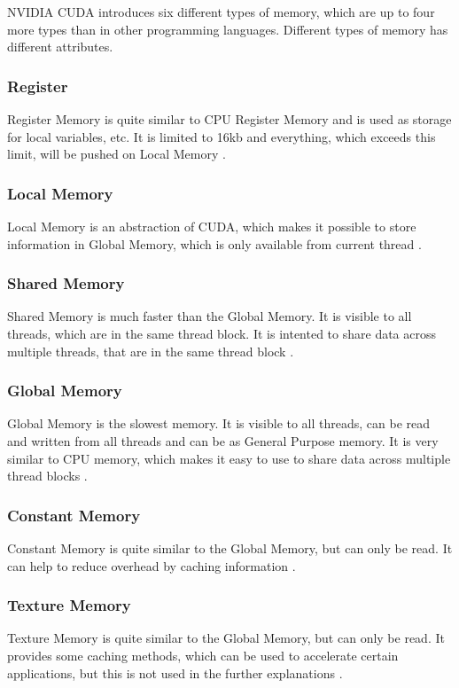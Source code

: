 \documentclass[conference]{IEEEtran}
\begin{document}
		NVIDIA CUDA introduces six different types of memory, which are up to four more types than in other programming languages. Different types of memory has different attributes.

		\subsubsection{Register}
			Register Memory is quite similar to CPU Register Memory and is used as storage for local variables, etc. It is limited to 16kb and everything, which exceeds this limit, will be pushed on Local Memory \cite{accsql}.
		\subsubsection{Local Memory}
			Local Memory is an abstraction of CUDA, which makes it possible to store information in Global Memory, which is only available from current thread \cite{accsql}.
		\subsubsection{Shared Memory}
			Shared Memory is much faster than the Global Memory. It is visible to all threads, which are in the same thread block. It is intented to share data across multiple threads, that are in the same thread block \cite{cudalite} \cite{cudap}.
		\subsubsection{Global Memory}
			Global Memory is the slowest memory. It is visible to all threads, can be read and written from all threads and can be as General Purpose memory. It is very similar to CPU memory, which makes it easy to use to share data across multiple thread blocks \cite{cudalite}.
		\subsubsection{Constant Memory}
			Constant Memory is quite similar to the Global Memory, but can only be read. It can help to reduce overhead by caching information \cite{cudalite} \cite{accsql}.
		\subsubsection{Texture Memory}
			Texture Memory is quite similar to the Global Memory, but can only be read. It provides some caching methods, which can be used to accelerate certain applications, but this is not used in the further explanations \cite{cudap}.
		
\end{document}
